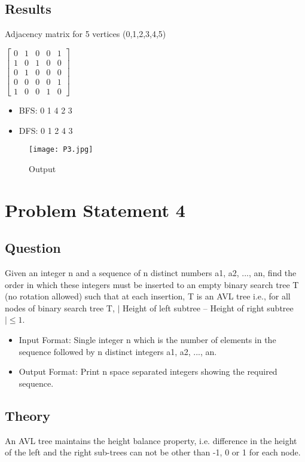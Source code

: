 \documentclass[11pt,a4paper]{article}
\begin{document}
\subsection{Results}\label{sec:results3}
Adjacency matrix for 5 vertices (0,1,2,3,4,5)

$
\begin{bmatrix}
0 & 1 & 0 & 0 & 1\\
1 & 0 & 1 & 0 & 0\\
0 & 1 & 0 & 0 & 0\\
0 & 0 & 0 & 0 & 1\\
1 & 0 & 0 & 1 & 0
\end{bmatrix}
$
\begin{itemize}
    \item BFS: 0 1 4 2 3
    \item DFS: 0 1 2 4 3
\end{itemize}
\begin{figure}[ht]
\texttt{[image: P3.jpg]}
\centering
\caption{Output}
\label{fig:output_3}
\end{figure}
\clearpage
\section{Problem Statement 4}\label{sec:problem4}
\subsection{Question}\label{sec:question4}
Given an integer n and a sequence of n distinct numbers a1, a2, ..., an, find the order in which these integers must be inserted to an empty binary search tree T (no rotation allowed) such that at each insertion, T is an AVL tree i.e., for all nodes of binary search tree T, $|$ Height of left subtree – Height of right subtree $| \leq 1 $.


\begin{itemize}
    \item Input Format: Single integer n which is the number of elements in the sequence followed by n
distinct integers a1, a2, ..., an.
    \item Output Format: Print n space separated integers showing the required sequence.
\end{itemize}

\subsection{Theory}\label{sec:theory4}
An AVL tree maintains the height balance property, i.e. difference in the height of the left and the right sub-trees can not be other than -1, 0 or 1 for each node.
\end{document}

